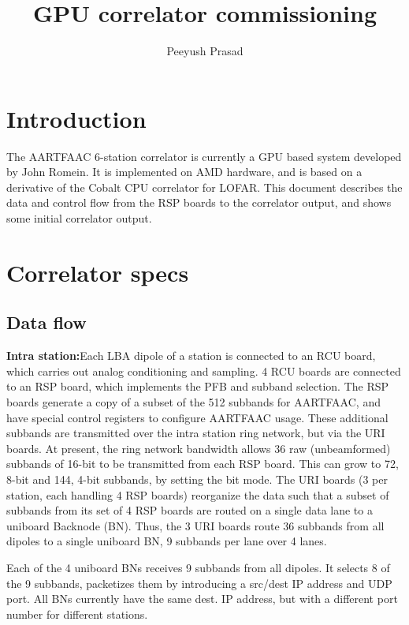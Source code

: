 \documentclass {article}
\begin{document}
\title {GPU correlator commissioning}
\author{Peeyush Prasad}
\maketitle

\section{Introduction}

The AARTFAAC 6-station  correlator is currently a GPU  based system developed by
John Romein. It is  implemented on AMD hardware, and is  based on a derivative of
the  Cobalt CPU  correlator  for LOFAR.  This  document describes  the data  and
control  flow from  the RSP  boards  to the  correlator output,  and shows  some
initial correlator output.

\section {Correlator specs}
\subsection {Data flow}
\textbf {Intra  station:}Each LBA  dipole of  a station is  connected to  an RCU
board,  which carries out  analog conditioning  and sampling.  4 RCU  boards are
connected to an  RSP board, which implements the PFB  and subband selection. The
RSP boards  generate a copy of  a subset of  the 512 subbands for  AARTFAAC, and
have special  control registers to  configure AARTFAAC usage.   These additional
subbands are  transmitted over the intra  station ring network, but  via the URI
boards.  At  present, the  ring network bandwidth  allows 36  raw (unbeamformed)
subbands of 16-bit to  be transmitted from each RSP board. This  can grow to 72,
8-bit and 144,  4-bit subbands, by setting  the bit mode. The URI  boards (3 per
station, each handling  4 RSP boards) reorganize the data such  that a subset of
subbands from  its set of  4 RSP boards  are routed on a  single data lane  to a
uniboard  Backnode (BN).   Thus, the  3 URI  boards route  36 subbands  from all
dipoles to a single uniboard BN, 9 subbands per lane over 4 lanes.

Each of the 4 uniboard BNs receives 9 subbands from all dipoles. It selects 8 of
the 9  subbands, packetizes them  by introducing a  src/dest IP address  and UDP
port. All  BNs currently have the same  dest.  IP address, but  with a different
port number for different stations.
\end{document}
